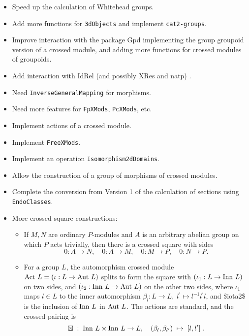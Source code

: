 \documentclass[a4paper,11pt]{report}
\begin{document}
{{\begin{itemize}
\item  Speed up the calculation of Whitehead groups. 
\item  Add more functions for \texttt{3dObjects} and implement \texttt{cat2-groups}. 
\item  Improve interaction with the package \textsf{Gpd} implementing the group groupoid version of a crossed module, and adding more
functions for crossed modules of groupoids. 
\item  Add interaction with \textsf{IdRel} (and possibly \textsf{XRes} and \textsf{natp}) . 
\item  Need \texttt{InverseGeneralMapping} for morphisms. 
\item  Need more features for \texttt{FpXMods}, \texttt{PcXMods}, etc. 
\item  Implement actions of a crossed module. 
\item  Implement \texttt{FreeXMods}. 
\item  Implement an operation \texttt{Isomorphism2dDomains}. 
\item  Allow the construction of a group of morphisms of crossed modules. 
\item  Complete the conversion from Version 1 of the calculation of sections using \texttt{EndoClasses}. 
\item  More crossed square constructions: 
\begin{itemize}
\item  If $M, N$ are ordinary $P$-modules and $A$ is an arbitrary abelian group on which $P$ acts trivially, then there is a crossed square with sides 
\[ 0 : A \to N,\quad 0 : A \to M,\quad 0 : M \to P,\quad 0 : N \to P. \]
 
\item  For a group $L$, the automorphism crossed module ${\rm Act}\ L = (\iota : L \to {\rm Aut}\ L)$ splits to form the square with $(\iota_1 : L \to {\rm Inn}\ L)$ on two sides, and $(\iota_2 : {\rm Inn}\ L \to {\rm Aut}\ L)$ on the other two sides, where $\iota_1$ maps $l \in L$ to the inner automorphism $\beta_l : L \to L,\; l^{\prime} \mapsto l^{-1}l^{\prime}l$, and \$\texttt{}iota{\textunderscore}2\$ is the inclusion of ${\rm Inn}\ L$ in ${\rm Aut}\ L$. The actions are standard, and the crossed pairing is 
\[ \boxtimes \;:\; {\rm Inn}\ L \times {\rm Inn}\ L \to L, \quad (\beta_l,
\beta_{l^{\prime}}) \;\mapsto\; [l, l^{\prime}]~. \]
 
\end{itemize}
 
\end{itemize}
 }

 }
\end{document}

